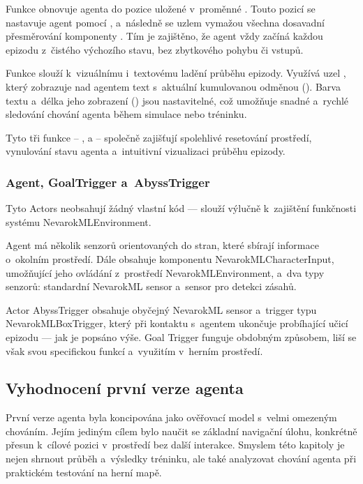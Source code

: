 Funkce  obnovuje agenta do pozice uložené v~proměnné . Touto pozicí se nastavuje agent pomocí , a~následně se uzlem  vymažou všechna dosavadní přesměrování komponenty . Tím je zajištěno, že agent vždy začíná každou epizodu z~čistého výchozího stavu, bez zbytkového pohybu či vstupů.

Funkce  slouží k~vizuálnímu i~textovému ladění průběhu epizody. Využívá uzel , který zobrazuje nad agentem text s~aktuální kumulovanou odměnou (). Barva textu a~délka jeho zobrazení () jsou nastavitelné, což umožňuje snadné a~rychlé sledování chování agenta během simulace nebo tréninku.

Tyto tři funkce – ,  a  – společně zajišťují spolehlivé resetování prostředí, vynulování stavu agenta a~intuitivní vizualizaci průběhu epizody.

\subsubsection{Agent, GoalTrigger a~AbyssTrigger}
Tyto Actors neobsahují žádný vlastní kód — slouží výlučně k~zajištění funkčnosti systému NevarokMLEnvironment.

Agent má několik senzorů orientovaných do stran, které sbírají informace o~okolním prostředí. Dále obsahuje komponentu NevarokMLCharacterInput, umožňující jeho ovládání z~prostředí NevarokMLEnvironment, a~dva typy senzorů: standardní NevarokML sensor a~sensor pro detekci zásahů.

Actor AbyssTrigger obsahuje obyčejný NevarokML sensor a~trigger typu NevarokMLBoxTrigger, který při kontaktu s~agentem ukončuje probíhající učicí epizodu — jak je popsáno výše. Goal Trigger funguje obdobným způsobem, liší se však svou specifickou funkcí a~využitím v~herním prostředí.

\newpage

\subsection{Vyhodnocení první verze agenta}

První verze agenta byla koncipována jako ověřovací model s~velmi omezeným chováním. Jejím jediným cílem bylo naučit se základní navigační úlohu, konkrétně přesun k~cílové pozici v~prostředí bez další interakce. Smyslem této kapitoly je nejen shrnout průběh a~výsledky tréninku, ale také analyzovat chování agenta při praktickém testování na herní mapě.

